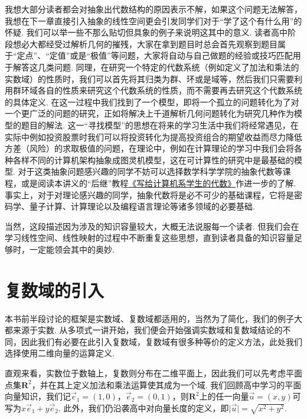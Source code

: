 我想大部分读者都会对抽象出代数结构的原因表示不解，如果这个问题无法解答，我想在下一章直接引入抽象的线性空间更会引发同学们对于``学了这个有什么用''的怀疑. 我们可以举一些不那么贴切但具象的例子来说明这其中的意义. 读者高中阶段想必大都经受过解析几何的摧残，大家在拿到题目时总会首先观察到题目属于``定点''、``定值''或是``极值''等问题，大家将自动与自己做题的经验或技巧匹配用于解答这几类问题. 同理，在研究一个特定的代数系统（例如定义了加法和乘法的实数域）的性质时，我们可以首先将其归类为群、环或是域等，然后我们只需要利用群环域各自的性质来研究这个代数系统的性质，而不需要再去研究这个代数系统的具体定义. 在这一过程中我们找到了一个模型，即将一个孤立的问题转化为了对一个更广泛的问题的研究，正如将解决上千道解析几何问题转化为研究几种作为模型的题目的解法. 这一``寻找模型''的思想在将来的学习生活中我们将经常遇见，在实际中例如投资股票时我们可以将投资转化为提高投资组合的期望收益而尽力降低方差（风险）的求取极值的问题，在理论中，例如在计算理论的学习中我们会将各种各样不同的计算机架构抽象成图灵机模型，这在可计算性的研究中是最基础的模型. 对于这类抽象问题感兴趣的同学不妨可以选择数学科学学院的抽象代数等课程，或是阅读本讲义的``后继''教程\href{https://frightenedfoxcn.github.io/notes/series/alg-for-cs/}{《写给计算机系学生的代数》}作进一步的了解. 事实上，对于对理论感兴趣的同学，抽象代数将是必不可少的基础课程，它将是密码学、量子计算、计算理论以及编程语言理论等诸多领域的必要基础.

当然，这段描述因为涉及的知识容量较大，大概无法说服每一个读者. 但我们会在学习线性空间、线性映射的过程中不断重复这些思想，直到读者具备的知识容量足够时，一定能领会其中的奥妙.

\section{复数域的引入}

本书前半段讨论的框架是实数域、复数域都适用的，当然为了简化，我们的例子大都来源于实数. 从多项式一讲开始，我们便会开始强调实数域和复数域结论的不同，因此我们有必要在此引入复数域，复数域有很多种等价的定义方法，此处我们选择使用二维向量的运算定义.

直观来看，实数位于数轴上，复数则分布在二维平面上，因此我们可以先考虑平面点集$\mathbf{R}^2$，并在其上定义加法和乘法运算使其成为一个域. 我们回顾高中学习的平面向量知识，我们记$\vec{e}_1=(1,0)$，$\vec{e}_2=(0,1)$，则$\mathbf{R}^2$上的任一向量$\vec{u}=(x,y)$可写为$x\vec{e}_1+y\vec{e}_2$. 此外，我们仍沿袭高中对向量长度的定义，即$\lvert\vec{u}\rvert=\sqrt{x^2+y^2}$.

